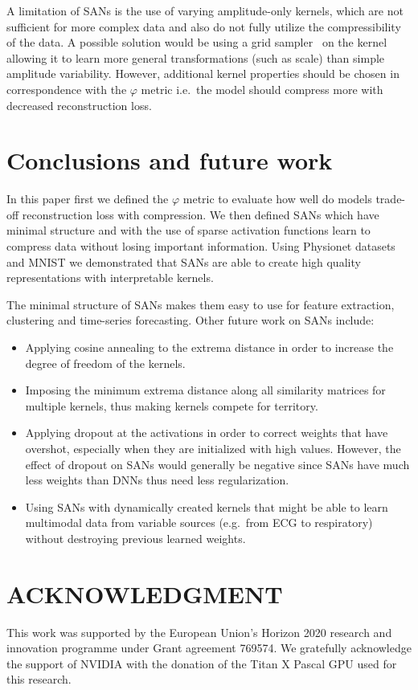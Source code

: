 \documentclass[journal]{IEEEtran}
\begin{document}
A limitation of SANs is the use of varying amplitude-only kernels, which are not sufficient for more complex data and also do not fully utilize the compressibility of the data.
A possible solution would be using a grid sampler~\cite{jaderberg2015spatial} on the kernel allowing it to learn more general transformations (such as scale) than simple amplitude variability.
However, additional kernel properties should be chosen in correspondence with the $\varphi$ metric i.e.\ the model should compress more with decreased reconstruction loss.

\section{Conclusions and future work}\label{sec:conclusions}
In this paper first we defined the $\varphi$ metric to evaluate how well do models trade-off reconstruction loss with compression.
We then defined SANs which have minimal structure and with the use of sparse activation functions learn to compress data without losing important information.
Using Physionet datasets and MNIST we demonstrated that SANs are able to create high quality representations with interpretable kernels.

The minimal structure of SANs makes them easy to use for feature extraction, clustering and time-series forecasting.
Other future work on SANs include:
\begin{itemize}
  \item Applying cosine annealing to the extrema distance in order to increase the degree of freedom of the kernels.
  \item Imposing the minimum extrema distance along all similarity matrices for multiple kernels, thus making kernels compete for territory.
  \item Applying dropout at the activations in order to correct weights that have overshot, especially when they are initialized with high values.
    However, the effect of dropout on SANs would generally be negative since SANs have much less weights than DNNs thus need less regularization.
  \item Using SANs with dynamically created kernels that might be able to learn multimodal data from variable sources (e.g.\ from ECG to respiratory) without destroying previous learned weights.
\end{itemize}

\section*{ACKNOWLEDGMENT}
This work was supported by the European Union's Horizon 2020 research and innovation programme under Grant agreement 769574.
We gratefully acknowledge the support of NVIDIA with the donation of the Titan X Pascal GPU used for this research.



\end{document}
